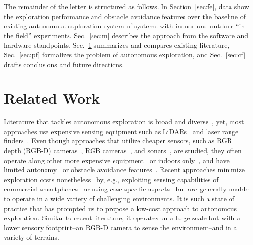 \documentclass[lettersize,journal]{IEEEtran}
\theoremstyle{definition}
\begin{document}
The remainder of the letter is structured as follows. In Section~\ref{sec:fe}, data show %
the exploration performance and obstacle avoidance features 
over the baseline of existing autonomous exploration system-of-systems with indoor and outdoor ``in the field'' experiments. 
Sec.~\ref{sec:m} describes the approach from the software and hardware standpoints. Sec.~\ref{sec:rw} summarizes and compares existing literature, Sec.~\ref{sec:pf} formalizes the problem of autonomous exploration, and Sec.~\ref{sec:cf} drafts conclusions %
and future directions.


\section{Related Work}
\label{sec:rw}

Literature that tackles autonomous exploration is broad and diverse~\cite{lluvia2021active,placed2022survey,julia2012comparison}, yet, most approaches use expensive sensing equipment such as LiDARs~\cite{kohlbrecher2014hector,kulkarni2022autonomous,tranzatto2022cerberus,roucek2020darpa,ebadi2020lamp,tardioli2019ground,dang2019graph,batinovic2021multi} and laser range finders~\cite{kim2022autonomous,surmann2003autonomous}. 
Even though approaches that utilize cheaper sensors, such as RGB depth (RGB-D) cameras~\cite{tranzatto2022cerberus,kim2022autonomous,roucek2020darpa,tabib2022autonomous,ebadi2020lamp,eldemiry2022autonomous,bircher2016receding,papachristos2017uncertainty,dai2020fast}, RGB cameras~\cite{zhou2021smartphone,dang2019graph,muller2021openbot}, and sonars~\cite{zhou2021smartphone,muller2021openbot}, are studied, they often operate along other more expensive equipment~\cite{dang2019graph,ebadi2020lamp,roucek2020darpa,kim2022autonomous,tranzatto2022cerberus} or indoors only~\cite{bircher2016receding,eldemiry2022autonomous,dai2020fast,papachristos2017uncertainty,zhou2021smartphone}, and have limited autonomy~\cite{bircher2016receding,papachristos2017uncertainty,dai2020fast} or obstacle avoidance features~\cite{zhou2021smartphone,muller2021openbot}.
Recent approaches minimize exploration costs nonetheless~\cite{muller2021openbot,zhou2021smartphone,tabib2022autonomous,eldemiry2022autonomous,bircher2016receding} by, e.g., exploiting sensing capabilities of commercial smartphones~\cite{muller2021openbot,zhou2021smartphone} or using case-specific aspects~\cite{tabib2022autonomous} but are generally unable to operate in a wide variety of challenging %
environments.
%
It is such a state of practice that has prompted us to propose a low-cost approach to autonomous exploration. Similar to recent literature, it operates on a large scale but with a lower sensory footprint--an RGB-D camera to sense the environment--and in a variety of terrains. %
\end{document}
